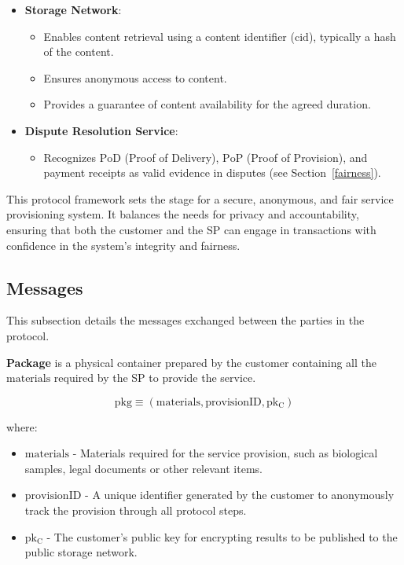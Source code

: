 \documentclass[pdftex,twocolumn,epjc3]{svjour3}
\begin{document}
{\begin{itemize}
\item \textbf{Storage Network}:
    \begin{itemize}
        \item Enables content retrieval using a content identifier ($\mathrm{cid}$), typically a hash of the content.
        \item Ensures anonymous access to content.
        \item Provides a guarantee of content availability for the agreed duration.
    \end{itemize}
    
\item \textbf{Dispute Resolution Service}:
    \begin{itemize}
        \item Recognizes $\mathrm{PoD}$ (Proof of Delivery), $\mathrm{PoP}$ (Proof of Provision), and payment receipts as valid evidence in disputes (see Section~\ref{fairness}).
    \end{itemize}
\end{itemize}


This protocol framework sets the stage for a secure, anonymous, and fair service provisioning system. It balances the needs for privacy and accountability, ensuring that both the customer and the SP can engage in transactions with confidence in the system's integrity and fairness.

\subsection{Messages}\label{messages}
This subsection details the messages exchanged between the parties in the protocol.

\vspace{5mm}

\noindent \textbf{Package}\label{package} is a physical container prepared by the customer containing all the $\mathrm{materials}$ required by the SP to provide the service.

$$\mathrm{pkg} \equiv (\mathrm{materials}, \mathrm{provisionID}, \mathrm{pk_C})$$

where:
\begin{itemize}
\item $\mathrm{materials}$ - Materials required for the service provision, such as biological samples, legal documents or other relevant items.
\item $\mathrm{provisionID}$ - A unique identifier generated by the customer to anonymously track the provision through all protocol steps.
\item $\mathrm{pk_C}$ - The customer's public key for encrypting results to be published to the public storage network.
\end{itemize}

}
\end{document}
